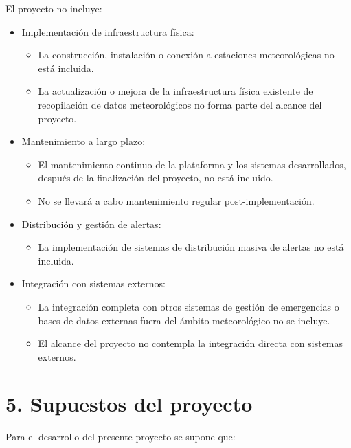 \documentclass[
11pt, %
codirector, %
]{charter}
\begin{document}
El proyecto no incluye:
\begin{itemize}
	\item Implementación de infraestructura física:
		\begin{itemize}
		\item La construcción, instalación o conexión a estaciones meteorológicas no está incluida.
		\item La actualización o mejora de la infraestructura física existente de recopilación de datos meteorológicos no forma parte del alcance del proyecto.
		\end{itemize}
	\item Mantenimiento a largo plazo:
		\begin{itemize}
		\item El mantenimiento continuo de la plataforma y los sistemas desarrollados, después de la finalización del proyecto, no está incluido.
		\item No se llevará a cabo mantenimiento regular post-implementación.
		\end{itemize}
	\item Distribución y gestión de alertas:
		\begin{itemize}
		\item La implementación de sistemas de distribución masiva de alertas no está incluida.
		\end{itemize}
	\item Integración con sistemas externos:
		\begin{itemize}
		\item La integración completa con otros sistemas de gestión de emergencias o bases de datos externas fuera del ámbito meteorológico no se incluye.
		\item El alcance del proyecto no contempla la integración directa con sistemas externos.
		\end{itemize}

\end{itemize}

\section{5. Supuestos del proyecto}
\label{sec:supuestos}

Para el desarrollo del presente proyecto se supone que: 
\end{document}
